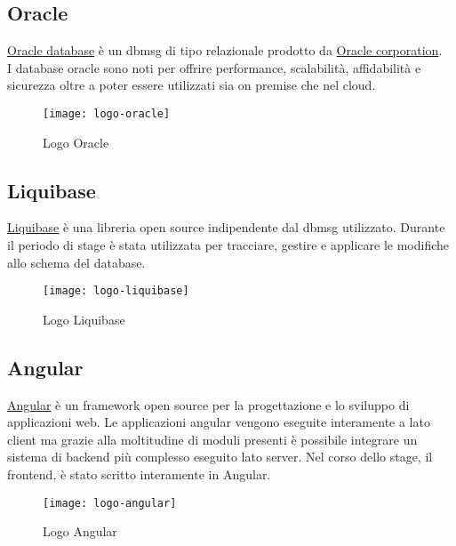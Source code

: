 \subsection{Oracle}
\label{oracle}
\href{https://www.oracle.com/it/database/}{Oracle database} è un \gls{dbmsg} di tipo relazionale prodotto da \href{https://www.oracle.com/}{Oracle corporation}. 
\\I database oracle sono noti per offrire performance, scalabilità, affidabilità e sicurezza oltre a poter essere utilizzati sia on premise che nel cloud.
\begin{figure}[h]
    \begin{center}
    \texttt{[image: logo-oracle]}
    \caption{Logo Oracle}
    \label{fig:figure7}
    \end{center}
\end{figure}

\subsection{Liquibase}
\href{https://www.liquibase.org/}{Liquibase} è una libreria open source indipendente dal \gls{dbmsg} utilizzato. Durante il periodo di stage è stata utilizzata per tracciare, gestire e applicare le modifiche allo schema del database.
\begin{figure}[h]
    \begin{center}
    \texttt{[image: logo-liquibase]}
    \caption{Logo Liquibase}
    \label{fig:figure8}
    \end{center}
\end{figure}
\subsection{Angular}
\href{https://angular.io/}{Angular} è un framework open source per la progettazione e lo sviluppo di applicazioni web.
Le applicazioni angular vengono eseguite interamente a lato client ma grazie alla moltitudine di moduli presenti è possibile integrare un sistema di backend più complesso eseguito lato server.
Nel corso dello stage, il frontend, è stato scritto interamente in Angular.
\begin{figure}[h]
    \begin{center}
    \texttt{[image: logo-angular]}
    \caption{Logo Angular}
    \label{fig:figure9}
    \end{center}
\end{figure}

